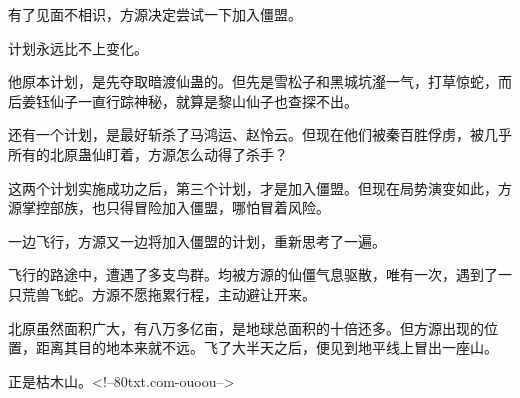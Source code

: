 \begin{this_body}
有了见面不相识，方源决定尝试一下加入僵盟。

计划永远比不上变化。

他原本计划，是先夺取暗渡仙蛊的。但先是雪松子和黑城坑瀣一气，打草惊蛇，而后姜钰仙子一直行踪神秘，就算是黎山仙子也查探不出。

还有一个计划，是最好斩杀了马鸿运、赵怜云。但现在他们被秦百胜俘虏，被几乎所有的北原蛊仙盯着，方源怎么动得了杀手？

这两个计划实施成功之后，第三个计划，才是加入僵盟。但现在局势演变如此，方源掌控部族，也只得冒险加入僵盟，哪怕冒着风险。

一边飞行，方源又一边将加入僵盟的计划，重新思考了一遍。

飞行的路途中，遭遇了多支鸟群。均被方源的仙僵气息驱散，唯有一次，遇到了一只荒兽飞蛇。方源不愿拖累行程，主动避让开来。

北原虽然面积广大，有八万多亿亩，是地球总面积的十倍还多。但方源出现的位置，距离其目的地本来就不远。飞了大半天之后，便见到地平线上冒出一座山。

正是枯木山。<!--80txt.com-ouoou-->

\end{this_body}

